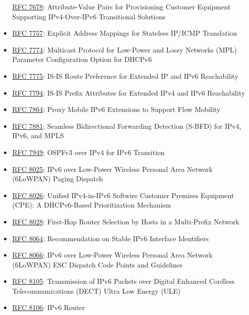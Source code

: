 \documentclass[
]{article}
\begin{document}
\begin{itemize}
  \href{https://www.rfc-editor.org/info/rfc7678}{RFC 7678}:
  Attribute-Value Pairs for Provisioning Customer Equipment Supporting
  IPv4-Over-IPv6 Transitional Solutions
\item
  \href{https://www.rfc-editor.org/info/rfc7757}{RFC 7757}: Explicit
  Address Mappings for Stateless IP/ICMP Translation
\item
  \href{https://www.rfc-editor.org/info/rfc7774}{RFC 7774}: Multicast
  Protocol for Low-Power and Lossy Networks (MPL) Parameter
  Configuration Option for DHCPv6
\item
  \href{https://www.rfc-editor.org/info/rfc7775}{RFC 7775}: IS-IS Route
  Preference for Extended IP and IPv6 Reachability
\item
  \href{https://www.rfc-editor.org/info/rfc7794}{RFC 7794}: IS-IS Prefix
  Attributes for Extended IPv4 and IPv6 Reachability
\item
  \href{https://www.rfc-editor.org/info/rfc7864}{RFC 7864}: Proxy Mobile
  IPv6 Extensions to Support Flow Mobility
\item
  \href{https://www.rfc-editor.org/info/rfc7881}{RFC 7881}: Seamless
  Bidirectional Forwarding Detection (S-BFD) for IPv4, IPv6, and MPLS
\item
  \href{https://www.rfc-editor.org/info/rfc7949}{RFC 7949}: OSPFv3 over
  IPv4 for IPv6 Transition
\item
  \href{https://www.rfc-editor.org/info/rfc8025}{RFC 8025}: IPv6 over
  Low-Power Wireless Personal Area Network (6LoWPAN) Paging Dispatch
\item
  \href{https://www.rfc-editor.org/info/rfc8026}{RFC 8026}: Unified
  IPv4-in-IPv6 Softwire Customer Premises Equipment (CPE): A
  DHCPv6-Based Prioritization Mechanism
\item
  \href{https://www.rfc-editor.org/info/rfc8028}{RFC 8028}: First-Hop
  Router Selection by Hosts in a Multi-Prefix Network
\item
  \href{https://www.rfc-editor.org/info/rfc8064}{RFC 8064}:
  Recommendation on Stable IPv6 Interface Identifiers
\item
  \href{https://www.rfc-editor.org/info/rfc8066}{RFC 8066}: IPv6 over
  Low-Power Wireless Personal Area Network (6LoWPAN) ESC Dispatch Code
  Points and Guidelines
\item
  \href{https://www.rfc-editor.org/info/rfc8105}{RFC 8105}: Transmission
  of IPv6 Packets over Digital Enhanced Cordless Telecommunications
  (DECT) Ultra Low Energy (ULE)
\item
  \href{https://www.rfc-editor.org/info/rfc8106}{RFC 8106}: IPv6 Router

\end{itemize}
\end{document}
